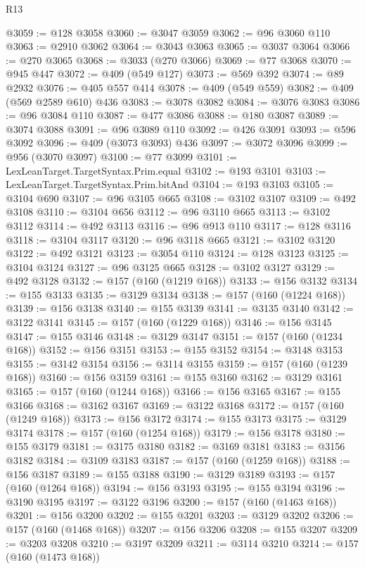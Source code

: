\begin{lexlean}{R13}
\begin{coremodule}
@3059 := @128 @3058
@3060 := @3047 @3059
@3062 := @96 @3060 @110
@3063 := @2910 @3062
@3064 := @3043 @3063
@3065 := @3037 @3064
@3066 := @270 @3065
@3068 := @3033 (@270 @3066)
@3069 := @77 @3068
@3070 := @945 @447
@3072 := @409 (@549 @127)
@3073 := @569 @392
@3074 := @89 @2932
@3076 := @405 @557 @414
@3078 := @409 (@549 @559)
@3082 := @409 (@569 @2589 @610) @436
@3083 := @3078 @3082
@3084 := @3076 @3083
@3086 := @96 @3084 @110
@3087 := @477 @3086
@3088 := @180 @3087
@3089 := @3074 @3088
@3091 := @96 @3089 @110
@3092 := @426 @3091
@3093 := @596 @3092
@3096 := @409 (@3073 @3093) @436
@3097 := @3072 @3096
@3099 := @956 (@3070 @3097)
@3100 := @77 @3099
@3101 := LexLeanTarget.TargetSyntax.Prim.equal
@3102 := @193 @3101
@3103 := LexLeanTarget.TargetSyntax.Prim.bitAnd
@3104 := @193 @3103
@3105 := @3104 @690
@3107 := @96 @3105 @665
@3108 := @3102 @3107
@3109 := @492 @3108
@3110 := @3104 @656
@3112 := @96 @3110 @665
@3113 := @3102 @3112
@3114 := @492 @3113
@3116 := @96 @913 @110
@3117 := @128 @3116
@3118 := @3104 @3117
@3120 := @96 @3118 @665
@3121 := @3102 @3120
@3122 := @492 @3121
@3123 := @3054 @110
@3124 := @128 @3123
@3125 := @3104 @3124
@3127 := @96 @3125 @665
@3128 := @3102 @3127
@3129 := @492 @3128
@3132 := @157 (@160 (@1219 @168))
@3133 := @156 @3132
@3134 := @155 @3133
@3135 := @3129 @3134
@3138 := @157 (@160 (@1224 @168))
@3139 := @156 @3138
@3140 := @155 @3139
@3141 := @3135 @3140
@3142 := @3122 @3141
@3145 := @157 (@160 (@1229 @168))
@3146 := @156 @3145
@3147 := @155 @3146
@3148 := @3129 @3147
@3151 := @157 (@160 (@1234 @168))
@3152 := @156 @3151
@3153 := @155 @3152
@3154 := @3148 @3153
@3155 := @3142 @3154
@3156 := @3114 @3155
@3159 := @157 (@160 (@1239 @168))
@3160 := @156 @3159
@3161 := @155 @3160
@3162 := @3129 @3161
@3165 := @157 (@160 (@1244 @168))
@3166 := @156 @3165
@3167 := @155 @3166
@3168 := @3162 @3167
@3169 := @3122 @3168
@3172 := @157 (@160 (@1249 @168))
@3173 := @156 @3172
@3174 := @155 @3173
@3175 := @3129 @3174
@3178 := @157 (@160 (@1254 @168))
@3179 := @156 @3178
@3180 := @155 @3179
@3181 := @3175 @3180
@3182 := @3169 @3181
@3183 := @3156 @3182
@3184 := @3109 @3183
@3187 := @157 (@160 (@1259 @168))
@3188 := @156 @3187
@3189 := @155 @3188
@3190 := @3129 @3189
@3193 := @157 (@160 (@1264 @168))
@3194 := @156 @3193
@3195 := @155 @3194
@3196 := @3190 @3195
@3197 := @3122 @3196
@3200 := @157 (@160 (@1463 @168))
@3201 := @156 @3200
@3202 := @155 @3201
@3203 := @3129 @3202
@3206 := @157 (@160 (@1468 @168))
@3207 := @156 @3206
@3208 := @155 @3207
@3209 := @3203 @3208
@3210 := @3197 @3209
@3211 := @3114 @3210
@3214 := @157 (@160 (@1473 @168))

\end{coremodule}
\end{lexlean}
